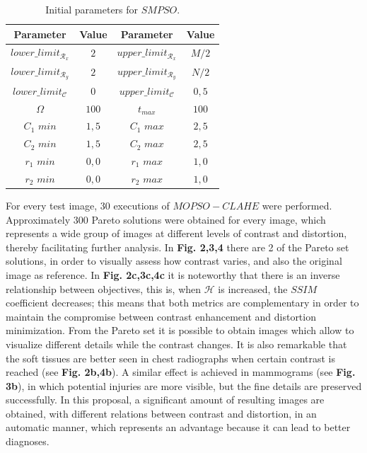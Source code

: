 \documentclass[spanish,twocolumn]{article}
\begin{document}
{\begin{table}[h]
\begin{center}
 \begin{tabular}{||c c | c c||} 
 \hline
 Parameter & Value & Parameter & Value \\ [0.5ex] 
 \hline\hline
 $lower\_limit_{\mathscr{R}_x}$ & $2$ & $upper\_limit_{\mathscr{R}_x}$ & $M/2$ \\ 
 \hline
 $lower\_limit_{\mathscr{R}_y}$ & $2$ & $upper\_limit_{\mathscr{R}_y}$ & $N/2$ \\  
 \hline
 $lower\_limit_{{\mathscr{C}}}$ & $0$ & $upper\_limit_{{\mathscr{C}}}$ & $0,5$ \\
\hline
$\Omega$ & $100$ & $t_{max}$ & $100$ \\ 
\hline
$C_1$ $min$ & $1,5$ & $C_1$ $max$ & $2,5$ \\ 
\hline
$C_2$ $min$ & $1,5$ & $C_2$ $max$ & $2,5$ \\ 
\hline
$r_1$ $min$ & $0,0$ & $r_1$ $max$ & $1,0$ \\ 
\hline
$r_2$ $min$ & $0,0$ & $r_2$ $max$ & $1,0$ \\ [1ex]
\hline
\end{tabular}
\end{center}
\caption[Parámetros de entrada para $SMPSO$]{Initial parameters for $SMPSO$.}
\label{table:parametrospso}
\end{table}
 
 For every test image, 30 executions of $MOPSO-CLAHE$ were performed. Approximately 300 Pareto solutions were obtained for every image, which represents a wide group of images at different levels of contrast and distortion, thereby facilitating further analysis. In \textbf {Fig. 2,3,4} there are 2 of the Pareto set solutions, in order to visually assess how contrast varies, and also the original image as reference. In \textbf {Fig. 2c,3c,4c} it is noteworthy that there is an inverse relationship between objectives, this is, when $\mathscr{H}$ is increased, the $SSIM$ coefficient decreases; this means that both metrics are complementary in order to maintain the compromise between contrast enhancement and distortion minimization. From the Pareto set it is possible to obtain images which allow to visualize different details while the contrast changes. It is also remarkable that the soft tissues are better seen in chest radiographs when certain contrast is reached (see \textbf {Fig. 2b,4b}). A similar effect is achieved in mammograms (see \textbf {Fig. 3b}), in which potential injuries are more visible, but the fine details are preserved successfully. In this proposal, a significant amount of resulting images are obtained, with different relations between contrast and distortion, in an automatic manner, which represents an advantage because it can lead to better diagnoses.


}
\end{document}
